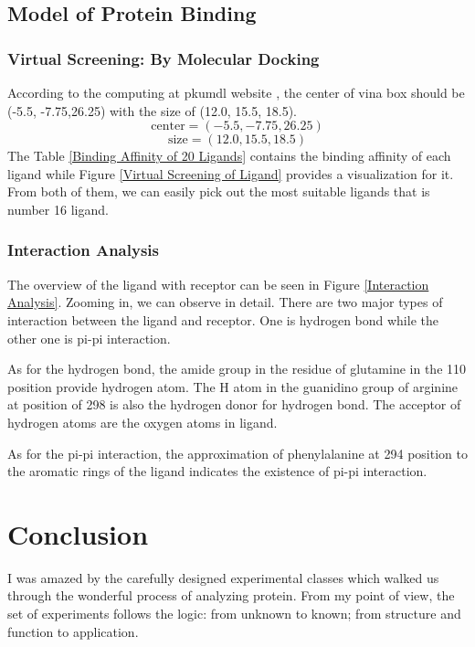 \documentclass{report}
\begin{document}
\section{Model of Protein Binding}
\subsection{Virtual Screening: By Molecular Docking}
According to the computing at pkumdl website \cite{pkumdl}, the center of vina box should be (-5.5, -7.75,26.25) with the size of (12.0, 15.5, 18.5).
$$
\text{center} = (-5.5, -7.75,26.25)
$$
$$
\text{size}= (12.0, 15.5, 18.5)
$$
The Table \ref{Binding Affinity of 20 Ligands} contains the binding affinity of each ligand while Figure \ref{Virtual Screening of Ligand} provides a visualization for it.
From both of them, we can easily pick out the most suitable ligands that is number 16 ligand.
\subsection{Interaction Analysis}
The overview of the ligand with receptor can be seen in Figure \ref{Interaction Analysis}.
Zooming in, we can observe in detail.
There are two major types of interaction between the ligand and receptor. One is hydrogen bond while the other one is pi-pi interaction.

As for the hydrogen bond, the amide group in the residue of glutamine in the 110 position provide hydrogen atom.
The H atom in the guanidino group of arginine at position of 298 is also the hydrogen donor for hydrogen bond.
The acceptor of hydrogen atoms are the oxygen atoms in ligand.

As for the pi-pi interaction, the approximation of phenylalanine at 294 position to the aromatic rings of the ligand indicates the existence of pi-pi interaction.

\chapter{Conclusion}
I was amazed by the carefully designed experimental classes which walked us through the wonderful process of analyzing protein.
From my point of view, the set of experiments follows the logic: from unknown to known; from structure and function to application.
\end{document}
